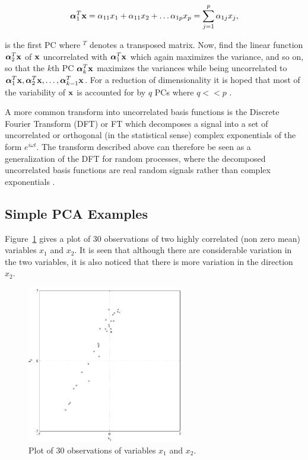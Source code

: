 \begin{equation}\label{eq:PCAdef}
\boldsymbol\alpha_1^T \textrm{\textbf{x}}= \alpha_{1{}1}x_1 +\alpha_{1{}1} x_2 + \ldots \alpha_{1{}p} x_p = \sum^p_{j=1}\alpha_{1{}j}x_j,
\end{equation}

is the first PC where ${}^T$ denotes a transposed matrix.
Now, find the linear function $\boldsymbol\alpha_2^T \textrm{\textbf{x}}$ of $\textrm{\textbf{x}}$ uncorrelated with $\boldsymbol\alpha_1^T \textrm{\textbf{x}}$ which again maximizes the variance, and so on, so that the $k$th PC $\boldsymbol\alpha_k^T \textrm{\textbf{x}}$ maximizes the variances while being uncorrelated to $\boldsymbol\alpha_1^T \textrm{\textbf{x}}, \boldsymbol\alpha_2^T \textrm{\textbf{x}}, \ldots, \boldsymbol\alpha_{k-1}^T \textrm{\textbf{x}}$. For a reduction of dimensionality it is hoped that most of the variability of $\textrm{\textbf{x}}$ is accounted for by $q$ PCs where $q<<p$ \citep[chap. 1]{Jolliffe1986}.

A more common transform into uncorrelated basis functions is the Discrete Fourier Transform (DFT) or FT which decomposes a signal into a set of uncorrelated or orthogonal (in the statistical sense) complex exponentials of the form $e^{i\omega t}$. The transform described above can therefore be seen as a generalization of the DFT for random processes, where the decomposed uncorrelated basis functions are real random signals rather than complex exponentials \citep[chap. 4.6]{Therrien1992}.

\subsection{Simple PCA Examples}

Figure~\ref{fig:30observations} gives a plot of 30 observations of two highly correlated (non zero mean) variables $x_1$ and $x_2$. It is seen that although there are considerable variation in the two variables, it is also noticed that there is more variation in the direction $x_2$.
\begin{figure}[!]
  \begin{center}
    \includegraphics[width=260px]{30observations.pdf}
    \caption{Plot of 30 observations of variables $x_1$ and $x_2$.}\label{fig:30observations}
  \end{center}
\end{figure}

